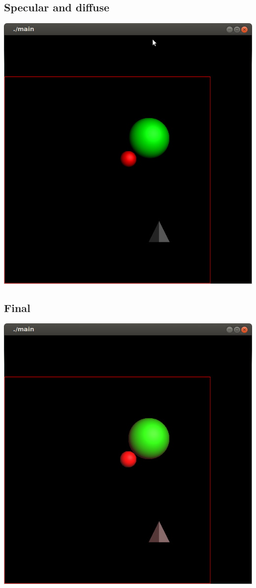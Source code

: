 \documentclass[12pt]{article}
\begin{document}
\subsection{Specular and diffuse}
\includegraphics[scale=.75]{speculardiffuse.png}
\subsection{Final}
\includegraphics[scale=.75]{final.png}
\end{document}
